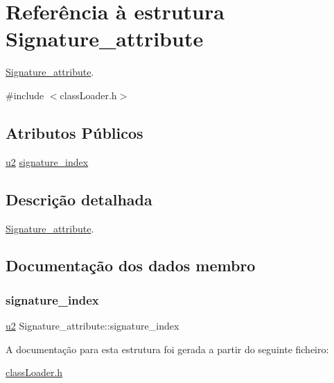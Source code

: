 \hypertarget{struct_signature__attribute}{}\section{Referência à estrutura Signature\+\_\+attribute}
\label{struct_signature__attribute}


\hyperlink{struct_signature__attribute}{Signature\+\_\+attribute}.  




{\ttfamily \#include $<$class\+Loader.\+h$>$}

\subsection*{Atributos Públicos}
\begin{DoxyCompactItemize}
\item 
\hyperlink{util_8h_a55ef8d87fd202b8417704c089899c5b9}{u2} \hyperlink{struct_signature__attribute_a80994e1ff64b1b79b261a07d07eab304}{signature\+\_\+index}
\end{DoxyCompactItemize}


\subsection{Descrição detalhada}
\hyperlink{struct_signature__attribute}{Signature\+\_\+attribute}. 

\subsection{Documentação dos dados membro}
\mbox{\label{struct_signature__attribute_a80994e1ff64b1b79b261a07d07eab304}} 
\subsubsection{\texorpdfstring{signature\+\_\+index}{signature\_index}}
{\footnotesize\ttfamily \hyperlink{util_8h_a55ef8d87fd202b8417704c089899c5b9}{u2} Signature\+\_\+attribute\+::signature\+\_\+index}



A documentação para esta estrutura foi gerada a partir do seguinte ficheiro\+:\begin{DoxyCompactItemize}
\item 
\hyperlink{class_loader_8h}{class\+Loader.\+h}\end{DoxyCompactItemize}
